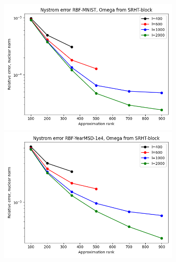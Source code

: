 \documentclass{article}
\theoremstyle{definition}
\begin{document}
\begin{figure}
\centering
\hfill\begin{subfigure}[t]{\textwidth+20pt\relax}
    \includegraphics[width=\dimexpr\linewidth-20pt\relax]{plots/relerror/relerror_RBF-MNIST_SRHT-block.png}
    \includegraphics[width=\dimexpr\linewidth-20pt\relax]{plots/relerror/relerror_RBF-YearMSD-1e4_SRHT-block.png}

\end{subfigure}
\end{figure}
\end{document}
